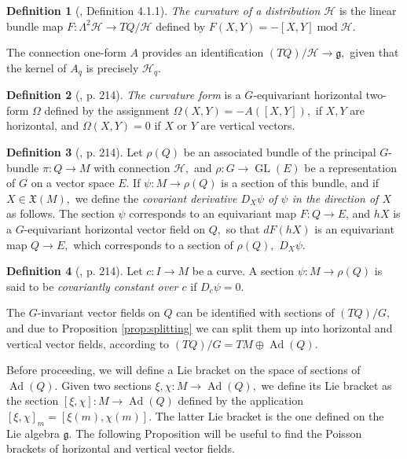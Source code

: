 \documentclass[12pt, letterpaper, reqno]{amsart}
\theoremstyle{definition}
\newtheorem{df}{Definition}
\theoremstyle{plain}
\theoremstyle{remark}
\begin{document}
\begin{df}[\cite{montgomery2002tour}, Definition 4.1.1]
	\textit{The curvature of a distribution $ \mathcal{H} $ } is the linear bundle map $ F: \Lambda^2 \mathcal{H} \rightarrow TQ/\mathcal{H} $ defined by $ F(X,Y) = -[X,Y] \operatorname{mod} \mathcal{H}.  $ 	
\end{df}
The connection one-form $ A $ provides an identification $ (TQ)/ \mathcal{H} \rightarrow \mathfrak{g}, $ given that the kernel of $ A_q $ is precisely $ \mathcal{H}_q. $ 

\begin{df}[\cite{montgomery2002tour}, p. 214]\label{df:curvature_form}
	\textit{The curvature form} is a $ G $-equivariant horizontal two-form $ \Omega $ defined by the assignment $ \Omega(X,Y) = -A([X,Y]), $ if $ X,Y $ are horizontal, and $ \Omega(X,Y)=0 $ if $ X $ or $ Y$ are vertical vectors.  
\end{df}

\begin{df}[\cite{montgomery2002tour}, p. 214]
	Let $ \rho(Q) $ be an associated bundle of the principal $ G $-bundle $ \pi: Q \rightarrow M $ with connection $ \mathcal{H}, $  and $ \rho:  G \rightarrow \operatorname{GL}(E) $ be a representation of $ G $ on a vector space $ E. $  If $ \psi: M \rightarrow \rho(Q) $ is a section of this bundle, and if $ X\in \mathfrak{X}(M), $ we define the \textit{covariant derivative $ D_X\psi $ of $ \psi $ in the direction of $ X $} as follows. The section $ \psi $ corresponds to an equivariant map $ F: Q \rightarrow E $, and $ hX $ is a $ G $-equivariant horizontal vector field on $ Q, $ so that $ dF(hX) $ is an equivariant map $ Q \rightarrow E, $ which corresponds to a section of $ \rho(Q), $ $ D_X\psi. $ 
\end{df}
\begin{df}[\cite{montgomery2002tour}, p. 214]\label{df:covariantly_constant}
	Let $ c:I \rightarrow M $ be a curve. A section $ \psi: M\rightarrow \rho(Q) $ is said to be \textit{covariantly constant over $ c $} if $ D_{\dot{c}}\psi=0. $  	
\end{df}
The $ G $-invariant vector fields on $ Q $ can be identified with sections of $ (TQ)/G, $ and due to Proposition \ref{prop:splitting} we can split them up into horizontal and vertical vector fields, according to $ (TQ)/G = TM \oplus \operatorname{Ad} (Q). $ 

Before proceeding, we will define a Lie bracket on the space of sections of $ \operatorname{Ad} (Q).$ Given two sections $ \xi,\chi: M \rightarrow \operatorname{Ad} (Q), $ we define its Lie bracket as the section $[\xi, \chi] : M \rightarrow \operatorname{Ad} (Q)$ defined by the application $ [\xi, \chi]_m= [\xi(m), \chi(m)]. $ The latter Lie bracket is the one defined on the Lie algebra $ \mathfrak{g}. $   The following Proposition will be useful to find the Poisson brackets of horizontal and vertical vector fields.
\end{document}
